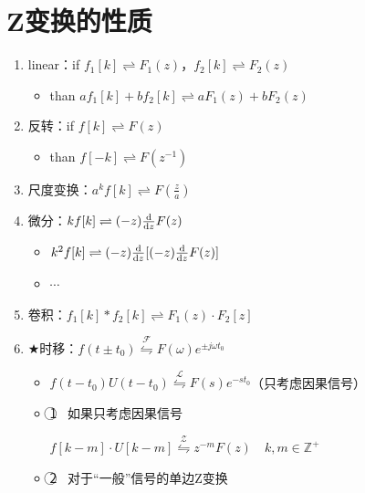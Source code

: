 \documentclass[UTF8]{ctexart}
\begin{document}
\section{Z变换的性质}
\begin{enumerate}[label=(\arabic*),itemindent=0pt,labelindent=\parindent,labelwidth=2em,labelsep=5pt,leftmargin=*]
  \item linear：if $f_1[k]\rightleftharpoons{F_1(z)}$，$f_2[k]\rightleftharpoons{F_2(z)}$ \par
        \begin{itemize}[label=,left=3em]
          \item than $af_1[k]+bf_2[k]\rightleftharpoons{aF_1(z)}+bF_2(z)$
        \end{itemize}
  \item 反转：if $f[k]\rightleftharpoons{F(z)}$ \par
        \begin{itemize}[label=,left=2.5em]
          \item than $f[-k]\rightleftharpoons{F(z^{-1})}$
        \end{itemize}
  \item 尺度变换：$a^kf[k]\rightleftharpoons{F(\frac{z}{a})}$
  \item 微分：$kf[k]\rightleftharpoons{(-z)\frac{\rm{d}}{{\rm{d}}z}F(z)}$ \par
        \begin{itemize}[label=,left=2.5em]
          \item $k^2f[k]\rightleftharpoons{(-z)\frac{\rm{d}}{{\rm{d}}z}[(-z)\frac{\rm{d}}{{\rm{d}}z}F(z)]}$
          \item $\cdots$
        \end{itemize}
  \item 卷积：$f_1[k]*f_2[k]\rightleftharpoons{F_1(z)\cdot F_2[z]}$
  \item $\bigstar$时移：$f(t\pm t_0)\stackrel{\mathscr{F}}{\leftrightharpoons}F(\omega)e^{\pm j\omega t_0}$ \par
        \begin{itemize}[label=,left=3.8em]
          \item $f(t-t_0)U(t-t_0)\stackrel{\mathscr{L}}{\leftrightharpoons}F(s)e^{-st_0}$（只考虑因果信号）
          \item \textcircled{1} \ 如果只考虑因果信号 \par
                \quad $f[k-m]\cdot U[k-m]\stackrel{\mathscr{Z}}{\leftrightharpoons}z^{-m}F(z) \quad k,m\in{\mathbb{Z^+}}$
          \item \textcircled{2} \ 对于“一般”信号的单边Z变换
        \end{itemize}
\end{enumerate}\par
\end{document}
